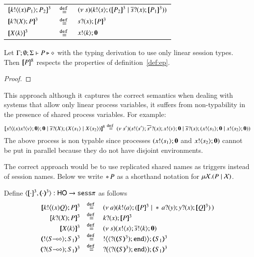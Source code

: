 \begin{definition}

	\begin{tabular}{lcl}
		$[\!\![k ! \langle (x)P_1 \rangle ; P_2]\!\!]^{3}$ &$\stackrel{\mathtt{def}\ }{=}$& $ \newsp{s}{\bout{k}{s} (\map{P_2}^3 \Par \binp{\dual{s}}{x} \map{P_1}^3)} $\\
		$[\!\![k ? (X) ; P]\!\!]^{3}$ &$\stackrel{\mathtt{def}\ }{=}$& $s ? (x) ; [\!\![P]\!\!]^3$\\
		$[\!\![X\langle k \rangle]\!\!]^3$ &$\stackrel{\mathtt{def}\ }{=}$& $x ! \langle k \rangle ; \mathbf{0}$
	\end{tabular}
\end{definition}

\begin{proposition}
	Let $\Gamma;\emptyset;\Sigma \vdash P \triangleright \diamond$ with
	the typing derivation to use only linear session types. Then
	$[\!\![P]\!\!]^8$ respects the properties of definition~\ref{def:ep}.
\end{proposition}

\begin{proof}
\end{proof}

This approach although it captures the correct semantics when
dealing with systems that allow only linear process variables,
it suffers from non-typability in the presence
of shared process variables. For example:
\[
	[\!\![s ! \langle (x)x ! \langle v \rangle ;\mathbf{0} \rangle ; \mathbf{0} \;|\; \overline{s} ? (X) ; (X\langle s_1 \rangle \;|\; X\langle s_2 \rangle)]\!\!]^8 \stackrel{\mathtt{def}\ }{=}
	(\nu\ s')(s ! \langle s' \rangle ; \overline{s'} ? (x) ; x ! \langle v \rangle ; \mathbf{0} \;|\; \overline{s} ? (x) ; (x ! \langle s_1 \rangle ; \mathbf{0} \;|\; x ! \langle s_2 \rangle ; \mathbf{0}))
\]
The above process is non typable since processes $(x ! \langle s_1 \rangle ; \mathbf{0}$ and $x ! \langle s_2 \rangle ; \mathbf{0})$
cannot be put in parallel because they do not have disjoint environments.

The correct approach would be to use replicated shared names
as triggers instead of session names. 
Below we write $\ast\,{} P$ as a shorthand notation for $\mu \mathcal{X}. (P \;|\; \mathcal{X})$.

\begin{definition}
  Define $\encod{\cdot}{\cdot}{3}: \HO \to \sesp$ as follows
  \[
	\begin{array}{rcl}
		\pmap{\bbout{k}{\abs{x} Q} P}{3} & \defeq &  \newsp{a}{\bout{k}{a} (\pmap{P}{3} \Par \repl{} \binp{a}{y} \binp{y}{x} \pmap{Q}{3})\,} \\
		\pmap{\binp{k}{X} P}{3} &\defeq&  \binp{k}{x} \pmap{P}{3}\\
		\pmap{\appl{X}{k}}{3} & \defeq & \newsp{s}{\bout{x}{s} \bout{\dual{s}}{k} \inact}\\
		\tmap{\btout{\lhot{S}}S_1}{3} & \defeq & \bbtout{\chtype{\btinp{\tmap{S}{3}}\tinact}}\tmap{S_1}{3} \\
		\tmap{\btinp{\lhot{S}}S_1}{3} & \defeq & \bbtinp{\chtype{\btinp{\tmap{S}{3}}\tinact}}\tmap{S_1}{3}
	\end{array}
	\]
\end{definition}

